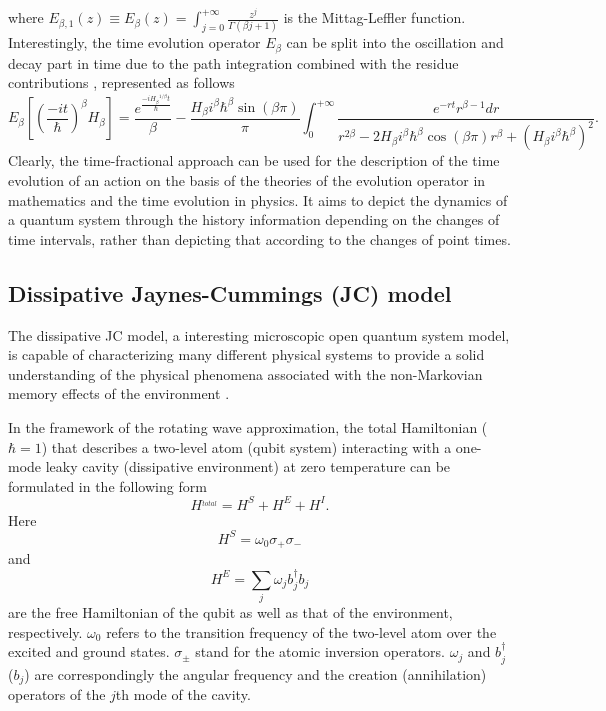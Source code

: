 \documentclass[
showpacs,  %
showkeys,  %
aps,       %
amsthm,    %
amsmath,   %
amsfonts,  %
amssymb    %
]{revtex4-1}          %
\begin{document}
where ${E_{\beta ,1}}(z) \equiv {E_\beta }(z) = \int_{j = 0}^{ + \infty } {\frac{{{z^j}}}{{\Gamma (\beta j + 1)}}}$ is the Mittag-Leffler function. Interestingly, the time evolution operator ${E_\beta}$ can be split into the oscillation and decay part in time due to the path integration combined with the residue contributions \cite{Naber2004,Iomin2009}, represented as follows
\begin{equation}
\label{e4}
{E_\beta }\left[ {{{(\frac{{ - it}}{\hbar })}^\beta }{H_\beta }} \right] = \frac{{{e^{\frac{{ - i{H_\beta }^{1/\beta }t}}{\hbar }}}}}{\beta } - \frac{{{H_\beta }{i^\beta }{\hbar ^\beta }\sin (\beta \pi )}}{\pi }\int_0^{ + \infty } {\frac{{{e^{ - rt}}{r^{\beta  - 1}}dr}}{{{r^{2\beta }} - 2{H_\beta }{i^\beta }{\hbar ^\beta }\cos (\beta \pi ){r^\beta } + {{({H_\beta }{i^\beta }{\hbar ^\beta })}^2}}}}.
\end{equation}
Clearly, the time-fractional approach can be used for the description of the time evolution of an action on the basis of the theories of the evolution operator in mathematics and the time evolution in physics. It aims to depict the dynamics of a quantum system through the history information depending on the changes of time intervals, rather than depicting that according to the changes of point times.



\subsection{Dissipative Jaynes-Cummings (JC) model}
\label{Subsec:22}
The dissipative JC model, a interesting microscopic open quantum system model, is capable of characterizing many different physical systems to provide a solid understanding of the physical phenomena associated with the non-Markovian memory effects of the environment \cite{Garraway1997}.

In the framework of the rotating wave approximation, the total Hamiltonian ($\hbar=1$) that describes a two-level atom (qubit system) interacting with a one-mode leaky cavity (dissipative environment) at zero temperature can be formulated in the following form
\begin{equation}
\label{e5}
{H^{_{total}}} = {H^S} + {H^E} + {H^I}.
\end{equation}
Here
\begin{equation}
\label{e6}
{H^S} = {\omega _0}{\sigma _ + }{\sigma _ - }
\end{equation}
and
\begin{equation}
\label{e7}
{H^E} = \sum\limits_j {{\omega _j}} b_j^\dag {b_j}
\end{equation}
are the free Hamiltonian of the qubit as well as that of the environment, respectively. ${\omega _0}$ refers to the transition frequency of the two-level atom over the excited and ground states. ${\sigma _ \pm }$ stand for the atomic inversion operators. ${\omega _j}$ and $b_j^\dag$ (${b_j}$) are correspondingly the angular frequency and the creation (annihilation) operators of the $j$th mode of the cavity.
\end{document}
